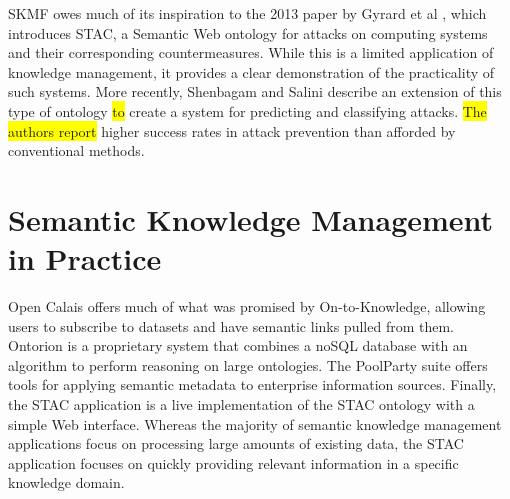 SKMF owes much of its inspiration to the 2013 paper by Gyrard et al
\cite{ontosec},
which introduces STAC, a Semantic Web ontology for attacks on computing systems and their corresponding countermeasures. While this is a limited application of knowledge management, it provides a clear demonstration of the practicality of such systems. More recently, Shenbagam and Salini
\cite{vulncontol}
describe an extension of this type of ontology
\colorbox{yellow}{to}
create a system for predicting and classifying attacks.
\colorbox{yellow}{The authors report}
higher success rates in attack prevention than afforded by conventional methods.


\section{Semantic Knowledge Management in Practice}
\label{applications}

Open Calais
\cite{opencalais}
offers much of what was promised by On-to-Knowledge, allowing users to subscribe to datasets and have semantic links pulled from them. Ontorion
\cite{ontorion}
is a proprietary system that combines a noSQL database with an algorithm to perform reasoning on large ontologies. The PoolParty suite
\cite{poolparty}
offers tools for applying semantic metadata to enterprise information sources. Finally, the STAC application
\cite{stacweb}
is a live implementation of the STAC ontology with a simple Web interface. Whereas the majority of semantic knowledge management applications focus on processing large amounts of existing data, the STAC application focuses on quickly providing relevant information in a specific knowledge domain.
